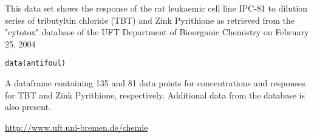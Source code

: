 \begin{Description}\relax
This data set shows the response of the rat leukaemic cell line IPC-81 to 
dilution series of tributyltin chloride (TBT) and Zink Pyrithione as retrieved
from the "cytotox" database of the UFT Department of Bioorganic Chemistry on 
February 25, 2004
\end{Description}
\begin{Usage}
\begin{verbatim}data(antifoul)\end{verbatim}
\end{Usage}
\begin{Format}\relax
A dataframe containing 135 and 81 data points for concentrations and responses
for TBT and Zink Pyrithione, respectively. Additional data from the database is 
also present.
\end{Format}
\begin{Source}\relax
\url{http://www.uft.uni-bremen.de/chemie}
\end{Source}

